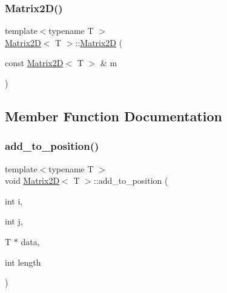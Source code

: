 \mbox{\label{classMatrix2D_aa1d3642d7cea07adac1a7bd83586d292_aa1d3642d7cea07adac1a7bd83586d292}} 
\subsubsection{\texorpdfstring{Matrix2\+D()}{Matrix2D()}\hspace{0.1cm}{\footnotesize\ttfamily [3/3]}}
{\footnotesize\ttfamily template$<$typename T $>$ \\
\mbox{\hyperlink{classMatrix2D}{Matrix2D}}$<$ T $>$\+::\mbox{\hyperlink{classMatrix2D}{Matrix2D}} (\begin{DoxyParamCaption}\item[{const \mbox{\hyperlink{classMatrix2D}{Matrix2D}}$<$ T $>$ \&}]{m }\end{DoxyParamCaption})}



\subsection{Member Function Documentation}
\mbox{\label{classMatrix2D_a2bd34bc1808af36aa3dce5af143ce304_a2bd34bc1808af36aa3dce5af143ce304}} 
\subsubsection{\texorpdfstring{add\+\_\+to\+\_\+position()}{add\_to\_position()}}
{\footnotesize\ttfamily template$<$typename T $>$ \\
void \mbox{\hyperlink{classMatrix2D}{Matrix2D}}$<$ T $>$\+::add\+\_\+to\+\_\+position (\begin{DoxyParamCaption}\item[{int}]{i,  }\item[{int}]{j,  }\item[{T $\ast$}]{data,  }\item[{int}]{length }\end{DoxyParamCaption})}

\mbox{\label{classMatrix2D_a5fd8ff857d4554c8fed6ca1ca2f1e87d_a5fd8ff857d4554c8fed6ca1ca2f1e87d}} 
